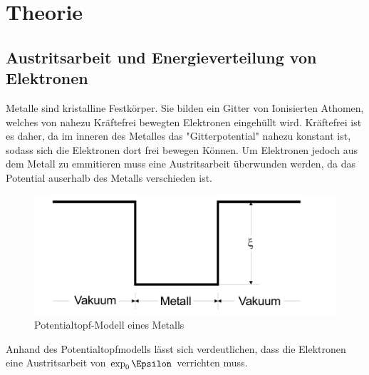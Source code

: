 \section{Theorie}
\label{sec:Theorie}
\subsection{Austritsarbeit und Energieverteilung von Elektronen}
Metalle sind kristalline Festkörper. Sie bilden ein Gitter von 
Ionisierten Athomen, welches von nahezu Kräftefrei bewegten Elektronen 
eingehüllt wird. Kräftefrei ist es daher, da im inneren des Metalles das "Gitterpotential"
nahezu konstant ist, sodass sich die Elektronen dort frei bewegen Können. Um Elektronen jedoch 
aus dem Metall zu emmitieren muss eine Austritsarbeit überwunden werden, da das Potential auserhalb 
des Metalls verschieden ist.
\begin{figure}[H]
    \centering
        \centering
        \includegraphics[width=\textwidth]{Bilder/potentialtopf.jpg}
        \caption{Potentialtopf-Modell eines Metalls}
    \hfill
    \label{fig:phasendiagramm}
\end{figure}
Anhand des Potentialtopfmodells lässt sich verdeutlichen, dass die Elektronen eine Austritsarbeit von 
$\exp _0 \Epsilon$ verrichten muss.


\cite{sample}
